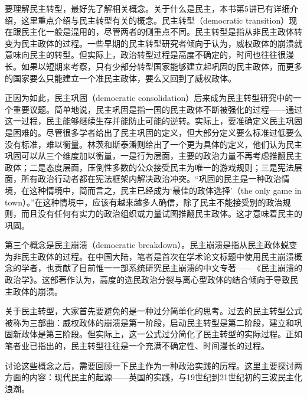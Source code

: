 
要理解民主转型，最好先了解相关概念。关于什么是民主，本书第5讲已有详细介绍，这里重点介绍与民主转型有关的概念。民主转型（democratic transition）现在跟民主化一般是混用的，尽管两者的侧重点不同。民主转型是指从非民主政体转变为民主政体的过程。一些早期的民主转型研究者倾向于认为，威权政体的崩溃就意味向民主的转型。但实际上，政治转型过程是高度不确定的，时间也往往很漫长。如果以短期来考察，只有少部分转型国家能够建立起巩固的民主政体，而更多的国家要么只能建立一个准民主政体，要么又回到了威权政体。

正因为如此，民主巩固（democratic consolidation）后来成为民主转型研究中的一个重要议题。简单地说，民主巩固是指一国的民主政体不断被强化的过程——通过这一过程，民主能够继续生存并能防止可能的逆转。实际上，要准确定义民主巩固是困难的。尽管很多学者给出了民主巩固的定义，但大部分定义要么标准过低要么没有标准，难以衡量。林茨和斯泰潘则给出了一个更为具体的定义，他们认为民主巩固可以从三个维度加以衡量，一是行为层面，主要的政治力量不再考虑推翻民主政体；二是态度层面，压倒性多数的公众接受民主为唯一的游戏规则；三是宪法层面，所有政治行动者都在宪法框架内解决政治冲突。“巩固的民主是一种政治情境，在这种情境中，简而言之，民主已经成为‘最佳的政体选择’（the only game in town）。”在这种情境中，应该有越来越多人确信，除了民主不能接受别的政治规则，而且没有任何有实力的政治组织或力量试图推翻民主政体。这才意味着民主的巩固。

第三个概念是民主崩溃（democratic breakdown）。民主崩溃是指从民主政体蜕变为非民主政体的过程。在中国大陆，笔者是首次在学术论文标题中使用民主崩溃概念的学者，也贡献了目前惟一一部系统研究民主崩溃的中文专著——《民主崩溃的政治学》。这部著作认为，高度的选民政治分裂与离心型政体的结合倾向于导致民主政体的崩溃。

关于民主转型，大家首先要避免的是一种过分简单化的思考。过去的民主转型公式被称为三部曲：威权政体的崩溃是第一阶段，启动民主转型是第二阶段，建立和巩固新政体是第三阶段。但实际上，这一公式过分简化了民主转型的实际过程。正如笔者业已指出的，民主转型往往是一个充满不确定性、时间漫长的过程。


讨论这些概念之后，需要回顾一下民主作为一种政治实践的历程。这里主要探讨两方面的内容：现代民主的起源——英国的实践，与19世纪到21世纪初的三波民主化浪潮。

